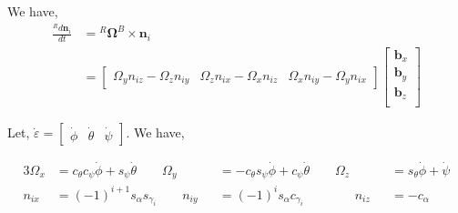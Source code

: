 We have,
\begin{align*}
    \frac{{}^R d\pmb n_i}{dt} &= {}^R \pmb \Omega^B \times \pmb n_i\\
    &= \begin{bmatrix}
        \Omega_y n_{iz} - \Omega_z n_{iy} &
        \Omega_z n_{ix} - \Omega_x n_{iz} &
        \Omega_x n_{iy} - \Omega_y n_{ix}
    \end{bmatrix}
    \begin{bmatrix}
    \pmb b_x \\ \pmb b_y \\ \pmb b_z\\
    \end{bmatrix}
\end{align*}

Let, $\dot \varepsilon  = \begin{bmatrix} \dot \phi & \dot \theta & \dot \psi \end{bmatrix}$. We have,

\begin{alignat*}{3}
        \Omega_x &=  c_{\theta}c_{\psi} \dot \phi + s_{\psi} \dot \theta \qquad
        \Omega_y &&= -c_{\theta}s_{\psi} \dot \phi + c_{\psi} \dot \theta \qquad
        \Omega_z &&= s_{\theta} \dot \phi + \dot \psi\\
        n_{ix}   &=  (-1)^{i+1} s_{\alpha} s_{\gamma_i} \qquad
        n_{iy}   &&= (-1)^{i} s_{\alpha} c_{\gamma_i}  \qquad \qquad
        n_{iz}   &&= -c_{\alpha}
\end{alignat*}

